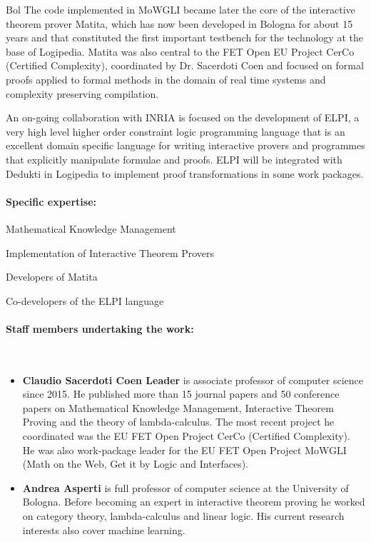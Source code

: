 \begin{sitedescription}{Bol}
The code implemented in MoWGLI became later the core of the interactive theorem prover Matita, which has now been developed in Bologna for about 15 years and that constituted the first important testbench for the technology at the base of Logipedia. Matita was also central to the FET Open EU Project CerCo (Certified Complexity), coordinated by Dr. Sacerdoti Coen and focused on formal proofs applied to formal methods in the domain of real time systems and complexity preserving compilation.

An on-going collaboration with INRIA is focused on the development of ELPI, a very high level higher order constraint logic programming language that is an excellent domain specific language for writing interactive provers and programmes that explicitly manipulate formulae and proofs. ELPI will be integrated with Dedukti in Logipedia to implement proof transformations in some work packages.

\paragraph{Specific expertise:}

\begin{compactitem}
\item Mathematical Knowledge Management
\item Implementation of Interactive Theorem Provers
\item Developers of Matita
\item Co-developers of the ELPI language
\end{compactitem}

\paragraph{Staff members undertaking the work:}~

\begin{itemize}
\item \textbf{Claudio Sacerdoti Coen Leader} is associate professor of computer science since 2015. He published more than 15 journal papers and 50 conference papers on Mathematical Knowledge Management, Interactive Theorem Proving and the theory of lambda-calculus. The most recent project he coordinated was the EU FET Open Project CerCo (Certified Complexity). He was also work-package leader for the EU FET Open Project MoWGLI (Math on the Web, Get it by Logic and Interfaces).

\item \textbf{Andrea Asperti} is full professor of computer science at the University of Bologna. Before becoming an expert in interactive theorem proving he worked on category theory, lambda-calculus and linear logic. His current research interests also cover machine learning.
\end{itemize}

\end{sitedescription}

